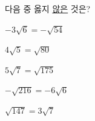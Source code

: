 다음 중 옳지 \underline{않은} 것은?
\begin{choicesii}{\rule[-3ex]{0pt}{8ex}$-3\sqrt{6}=-\sqrt{54}$}{\rule[-3ex]{0pt}{8ex}$4\sqrt{5}=\sqrt{80}$}{\rule[-3ex]{0pt}{8ex}$5\sqrt{7}=\sqrt{175}$}{\rule[-3ex]{0pt}{8ex}$-\sqrt{216}=-6\sqrt{6}$}{\rule[-3ex]{0pt}{8ex}$\sqrt{147}=3\sqrt{7}$}\end{choicesii}

